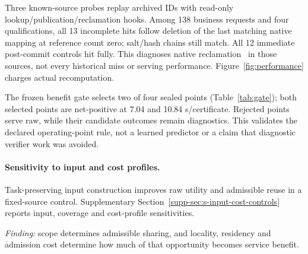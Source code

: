 Three known-source probes replay archived IDs with read-only lookup/publication/reclamation hooks. Among 138 business requests and four qualifications, all 13 incomplete hits follow deletion of the last matching native mapping at reference count zero; salt/hash chains still match. All 12 immediate post-commit controls hit fully. This diagnoses native reclamation~\cite{vllmAPC} in those sources, not every historical miss or serving performance. Figure~\ref{fig:performance} charges actual recomputation.



The frozen benefit gate selects two of four sealed points (Table~\ref{tab:gate}); both selected points are net-positive at 7.04 and 10.84 s/certificate. Rejected points serve raw, while their candidate outcomes remain diagnostics. This validates the declared operating-point rule, not a learned predictor or a claim that diagnostic verifier work was avoided.

\paragraph{Sensitivity to input and cost profiles.}\label{sec:costvariant}
\label{sec:fidelity}
Task-preserving input construction improves raw utility and admissible reuse in a fixed-source control. Supplementary Section~\ref{supp-sec:s-input-cost-controls} reports input, coverage and cost-profile sensitivities.

\noindent\emph{Finding:} scope determines admissible sharing, and locality, residency and admission cost determine how much of that opportunity becomes service benefit.
